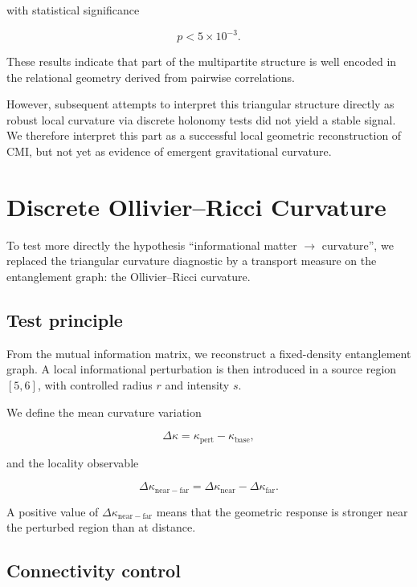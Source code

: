 \documentclass[11pt]{article}
\begin{document}
with statistical significance

\[
p < 5\times10^{-3}.
\]

These results indicate that part of the multipartite structure is
well encoded in the relational geometry derived from pairwise
correlations.

However, subsequent attempts to interpret this triangular structure
directly as robust local curvature via discrete holonomy tests did
not yield a stable signal. We therefore interpret this part as a
successful local geometric reconstruction of CMI, but not yet as
evidence of emergent gravitational curvature.


\section{Discrete Ollivier--Ricci Curvature}

To test more directly the hypothesis
``informational matter $\rightarrow$ curvature'',
we replaced the triangular curvature diagnostic by a transport
measure on the entanglement graph: the Ollivier--Ricci curvature.

\subsection{Test principle}

From the mutual information matrix, we reconstruct a fixed-density
entanglement graph. A local informational perturbation is then
introduced in a source region $[5,6]$, with controlled radius $r$
and intensity $s$.

We define the mean curvature variation

\[
\Delta \kappa = \kappa_{\mathrm{pert}}-\kappa_{\mathrm{base}},
\]

and the locality observable

\[
\Delta \kappa_{\mathrm{near-far}}
=
\Delta \kappa_{\mathrm{near}}
-
\Delta \kappa_{\mathrm{far}}.
\]

A positive value of $\Delta \kappa_{\mathrm{near-far}}$ means that
the geometric response is stronger near the perturbed region than
at distance.

\subsection{Connectivity control}
\end{document}
